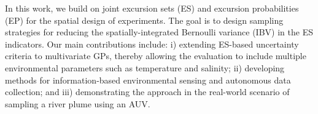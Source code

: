 \documentclass[aoas]{imsart}
\begin{document}






In this work, we build on joint excursion sets (ES) and excursion probabilities (EP) for the spatial design of experiments. The goal is to
design sampling strategies for reducing the spatially-integrated
Bernoulli variance (IBV) in the ES indicators. Our main contributions
include: i) extending ES-based uncertainty criteria to multivariate
GPs, thereby allowing the evaluation to include multiple environmental
parameters such as temperature and salinity; ii) developing methods
for information-based environmental sensing and autonomous data collection;
and iii) demonstrating the approach in the real-world scenario of
sampling a river plume using an AUV.
\end{document}

